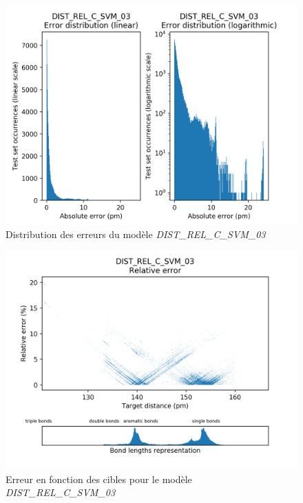 \begin{figure}
	\centering
	
	\includegraphics[scale=0.8]{../figures/DIST_REL_C_SVM_03/DIST_REL_C_SVM_03_distrib_rmse_val.png}	
	
	\caption{Distribution des erreurs du modèle \emph{DIST\_REL\_C\_SVM\_03}}
	\label{fdistrib_err_dist_rel_c_svm_01}
\end{figure}
\begin{figure}[!h]
	\centering
	
	\includegraphics[scale=0.8]{../figures/DIST_REL_C_SVM_03/DIST_REL_C_SVM_03_distrib_rmse_dist.png}	
	
	\caption{Erreur en fonction des cibles pour le modèle \emph{DIST\_REL\_C\_SVM\_03}}
		
	\label{fdistrib_err_rel_dist_rel_c_svm_01}

\end{figure}

